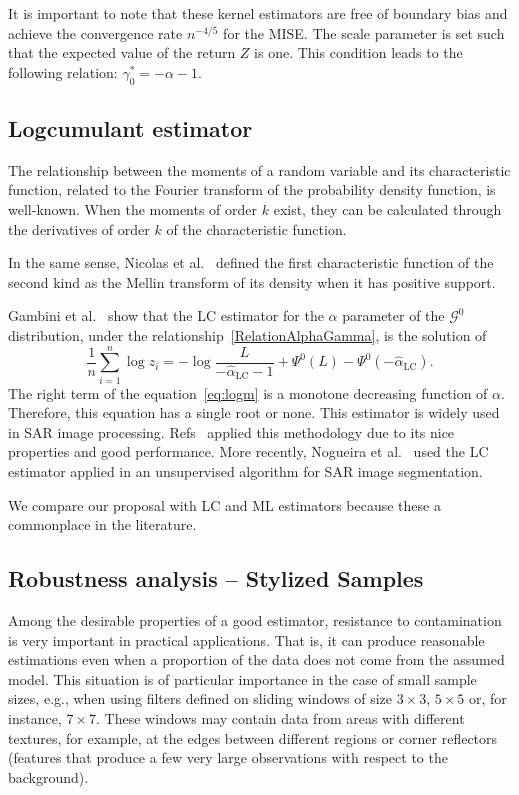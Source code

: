 \documentclass[twocolumn]{svjour3}
\begin{document}
	It is important to note that these kernel estimators are free of boundary bias and achieve the convergence rate $n^{-4/5}$ for the MISE.
	The scale parameter is set such that the expected value of the return $Z$ is one. 
	This condition leads to the following relation: $\gamma_0^*=-\alpha-1$.
	
	\subsection{Logcumulant estimator}\label{lc}
	
	The relationship between the moments of a random variable and its characteristic function, related to the Fourier transform of the probability density function, is well-known. 
	When the moments of order $k$ exist, they can be calculated through the derivatives of order $k$ of the characteristic function.
	
	In the same sense, Nicolas et al.~\cite{nicolas2002} defined the first characteristic function of the second kind as the Mellin transform of its density when it has positive support. 
	
	Gambini et al.~\cite{gambini2015} show that the LC estimator for the $\alpha$ parameter of the $\mathcal{G}^0$ distribution, under the relationship~\eqref{RelationAlphaGamma}, is the solution of 
	\begin{equation} \label{eq:logm}
		\frac{1}{n} \sum_{i=1}^n\log z_i =   -\log \frac{L}{-\widehat\alpha_{\text{{LC}}}-1} + \Psi^0(L) - \Psi^0(-\widehat\alpha_{\text{{LC}}}).
	\end{equation}
	The right term of the equation~\eqref{eq:logm} is a monotone decreasing function of $\alpha$. Therefore, this equation has a single root or none. 
	This estimator is widely used in SAR image processing. 
	Refs~\cite{MellinAnalysisPolSAR,BujorTrouveValetNicolas2004,khan2014} applied this methodology due to its nice properties and good performance. 
	More recently, Nogueira et al.~\cite{Nogueira2019} used the LC estimator applied in an unsupervised algorithm for SAR image segmentation.
	
	We compare our proposal with LC and ML estimators because these a commonplace in the literature.
	
	\subsection{Robustness analysis -- Stylized Samples}
	\label{robustez}
	Among the desirable properties of a good estimator, resistance to contamination is very important in practical applications. 
	That is, it can produce reasonable estimations even when a proportion of the data does not come from the assumed model. 
	This situation is of particular importance in the case of small sample sizes, e.g., when using filters defined on sliding windows of size $3 \times 3$, $5 \times 5$ or, for instance, $7 \times 7$. 
	These windows may contain data from areas with different textures, for example, at the edges between different regions or corner reflectors (features that produce a few very large observations with respect to the background).
	
\end{document}
